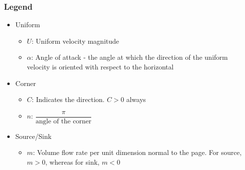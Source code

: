 \documentclass[10pt, letterpaper, notitlepage]{article}
\begin{document}
\subsubsection{Legend}
\begin{itemize}
  \item Uniform
  \begin{itemize}
    \item $U$: Uniform velocity magnitude
    \item $\alpha$: Angle of attack - the angle at which the direction of the uniform velocity is oriented with respect to the horizontal
  \end{itemize}
  \item Corner
  \begin{itemize}
    \item $C$: Indicates the direction. $C > 0$ always
    \item $n$: $\dfrac{\pi}{\text{angle of the corner}}$
  \end{itemize} 
  \item Source/Sink
  \begin{itemize}
    \item $m$: Volume flow rate per unit dimension normal to the page. For source, $m > 0$, whereas for sink, $m < 0$
  \end{itemize}     
\end{itemize}
\end{document}
